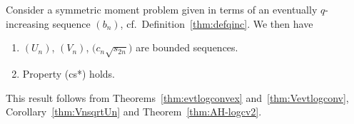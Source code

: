 \begin{thm}\label{thm:Main3} Consider a symmetric moment problem given in terms of an eventually $q$-increasing sequence $(b_n)$, cf.\ Definition~{\rm \ref{thm:defqinc}}. We then have
\begin{enumerate}\itemsep=0pt
\item[$(i)$] $(U_n)$, $(V_n)$, $\big(c_n\sqrt{s_{2n}}\big)$ are bounded sequences.
\item[$(ii)$] Property {\rm (cs*)} holds.
\end{enumerate}
\end{thm}

This result follows from Theorems~\ref{thm:evtlogconvex} and~\ref{thm:Vevtlogconv}, Corollary~\ref{thm:VnsqrtUn} and Theorem~\ref{thm:AH-logcv2}.
